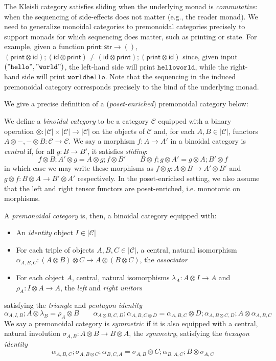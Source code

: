\documentclass[acmsmall,screen,anonymous,review]{acmart}
\newcommand{\mc}[1]{\ensuremath{\mathcal{#1}}}
\newcommand{\ms}[1]{\ensuremath{\mathsf{#1}}}
\begin{document}
The Kleisli category satisfies sliding when the underlying monad is \emph{commutative}: when the
sequencing of side-effects does not matter (e.g., the reader monad). We need to generalize monoidal
categories to premonoidal categories precisely to support monads for which sequencing does matter,
such as printing or state. For example, given a function $\ms{print}: \ms{str} \to ()$,
$
(\ms{print} \otimes \ms{id}) ; (\ms{id} \otimes \ms{print}) \neq
(\ms{id} \otimes \ms{print}) ; (\ms{print} \otimes \ms{id}) 
$
since, given input $(\mathtt{"hello"}, \mathtt{"world"})$, the left-hand side will print
$\mathtt{hello world}$, while the right-hand side will print $\mathtt{world hello}$. Note that the
sequencing in the induced premonoidal category corresponds precisely to the bind of the underlying
monad.

We give a precise definition of a (\emph{poset-enriched}) premonoidal category below:
\begin{definition}
  We define a \emph{binoidal category} to be a category $\mc{C}$ equipped with a binary operation
  $\otimes : |\mc{C}| \times |\mc{C}| \to |\mc{C}|$ on the objects of $\mc{C}$ and, for each $A, B
  \in |\mc{C}|$, functors $A \otimes -, - \otimes B : \mc{C} \to \mc{C}$. We say a morphism $f : A
  \to A'$ in a binoidal category is \emph{central} if, for all $g : B \to B'$, it satisfies
  \emph{sliding}:
  $$
  f \otimes B ; A' \otimes g = A \otimes g ; f \otimes B' \qquad
  B \otimes f ; g \otimes A' = g \otimes A ; B' \otimes f
  $$
  in which case we may write these morphisms as $f \otimes g : A \otimes B \to A' \otimes B'$ and $g
  \otimes f : B \otimes A \to B' \otimes A'$ respectively. In the poset-enriched setting, we also
  assume that the left and right tensor functors are poset-enriched, i.e. monotonic on morphisms.
  
  A \emph{premonoidal category} is, then, a
  binoidal category equipped with:
  \begin{itemize}
    \item An \emph{identity} object $I \in |\mc{C}|$
    \item For each triple of objects $A, B, C \in |\mc{C}|$, a central, natural isomorphism
    $\alpha_{A, B, C} : (A \otimes B) \otimes C \to A \otimes (B \otimes C)$, the \emph{associator}
    \item For each object $A$, central, natural isomorphisms $\lambda_A : A \otimes I \to A$ and
    $\rho_A : I \otimes A \to A$, the \emph{left} and \emph{right unitors}
  \end{itemize}
  satisfying the \emph{triangle} and \emph{pentagon identity}
  $$
  \alpha_{A, I, B} ; A \otimes \lambda_B = \rho_A \otimes B \qquad
  \alpha_{A \otimes B, C, D} ; \alpha_{A, B, C \otimes D}
  = \alpha_{A, B, C} \otimes D ; \alpha_{A, B \otimes C, D} ; A \otimes \alpha_{A, B, C}
  $$
  We say a premonoidal category is \emph{symmetric} if it is also equipped with a central, natural
  involution $\sigma_{A, B} : A \otimes B \to B \otimes A$, the \textit{symmetry}, satisfying the
  \emph{hexagon identity}
  $$
  \alpha_{A, B, C} ; \sigma_{A, B \otimes C} ; \alpha_{B, C, A}
  = \sigma_{A, B} \otimes C ; \alpha_{B, A, C} ; B \otimes \sigma_{A, C}
  $$
\end{definition}
\end{document}
